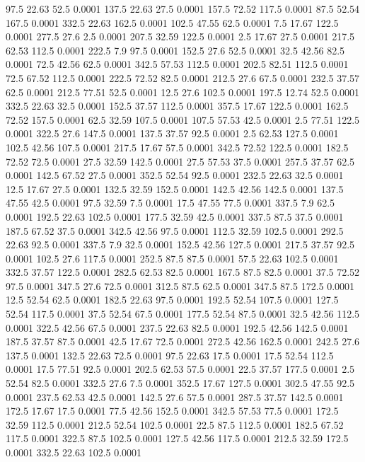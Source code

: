97.5	22.63	52.5	0.0001
137.5	22.63	27.5	0.0001
157.5	72.52	117.5	0.0001
87.5	52.54	167.5	0.0001
332.5	22.63	162.5	0.0001
102.5	47.55	62.5	0.0001
7.5	17.67	122.5	0.0001
277.5	27.6	2.5	0.0001
207.5	32.59	122.5	0.0001
2.5	17.67	27.5	0.0001
217.5	62.53	112.5	0.0001
222.5	7.9	97.5	0.0001
152.5	27.6	52.5	0.0001
32.5	42.56	82.5	0.0001
72.5	42.56	62.5	0.0001
342.5	57.53	112.5	0.0001
202.5	82.51	112.5	0.0001
72.5	67.52	112.5	0.0001
222.5	72.52	82.5	0.0001
212.5	27.6	67.5	0.0001
232.5	37.57	62.5	0.0001
212.5	77.51	52.5	0.0001
12.5	27.6	102.5	0.0001
197.5	12.74	52.5	0.0001
332.5	22.63	32.5	0.0001
152.5	37.57	112.5	0.0001
357.5	17.67	122.5	0.0001
162.5	72.52	157.5	0.0001
62.5	32.59	107.5	0.0001
107.5	57.53	42.5	0.0001
2.5	77.51	122.5	0.0001
322.5	27.6	147.5	0.0001
137.5	37.57	92.5	0.0001
2.5	62.53	127.5	0.0001
102.5	42.56	107.5	0.0001
217.5	17.67	57.5	0.0001
342.5	72.52	122.5	0.0001
182.5	72.52	72.5	0.0001
27.5	32.59	142.5	0.0001
27.5	57.53	37.5	0.0001
257.5	37.57	62.5	0.0001
142.5	67.52	27.5	0.0001
352.5	52.54	92.5	0.0001
232.5	22.63	32.5	0.0001
12.5	17.67	27.5	0.0001
132.5	32.59	152.5	0.0001
142.5	42.56	142.5	0.0001
137.5	47.55	42.5	0.0001
97.5	32.59	7.5	0.0001
17.5	47.55	77.5	0.0001
337.5	7.9	62.5	0.0001
192.5	22.63	102.5	0.0001
177.5	32.59	42.5	0.0001
337.5	87.5	37.5	0.0001
187.5	67.52	37.5	0.0001
342.5	42.56	97.5	0.0001
112.5	32.59	102.5	0.0001
292.5	22.63	92.5	0.0001
337.5	7.9	32.5	0.0001
152.5	42.56	127.5	0.0001
217.5	37.57	92.5	0.0001
102.5	27.6	117.5	0.0001
252.5	87.5	87.5	0.0001
57.5	22.63	102.5	0.0001
332.5	37.57	122.5	0.0001
282.5	62.53	82.5	0.0001
167.5	87.5	82.5	0.0001
37.5	72.52	97.5	0.0001
347.5	27.6	72.5	0.0001
312.5	87.5	62.5	0.0001
347.5	87.5	172.5	0.0001
12.5	52.54	62.5	0.0001
182.5	22.63	97.5	0.0001
192.5	52.54	107.5	0.0001
127.5	52.54	117.5	0.0001
37.5	52.54	67.5	0.0001
177.5	52.54	87.5	0.0001
32.5	42.56	112.5	0.0001
322.5	42.56	67.5	0.0001
237.5	22.63	82.5	0.0001
192.5	42.56	142.5	0.0001
187.5	37.57	87.5	0.0001
42.5	17.67	72.5	0.0001
272.5	42.56	162.5	0.0001
242.5	27.6	137.5	0.0001
132.5	22.63	72.5	0.0001
97.5	22.63	17.5	0.0001
17.5	52.54	112.5	0.0001
17.5	77.51	92.5	0.0001
202.5	62.53	57.5	0.0001
22.5	37.57	177.5	0.0001
2.5	52.54	82.5	0.0001
332.5	27.6	7.5	0.0001
352.5	17.67	127.5	0.0001
302.5	47.55	92.5	0.0001
237.5	62.53	42.5	0.0001
142.5	27.6	57.5	0.0001
287.5	37.57	142.5	0.0001
172.5	17.67	17.5	0.0001
77.5	42.56	152.5	0.0001
342.5	57.53	77.5	0.0001
172.5	32.59	112.5	0.0001
212.5	52.54	102.5	0.0001
22.5	87.5	112.5	0.0001
182.5	67.52	117.5	0.0001
322.5	87.5	102.5	0.0001
127.5	42.56	117.5	0.0001
212.5	32.59	172.5	0.0001
332.5	22.63	102.5	0.0001

